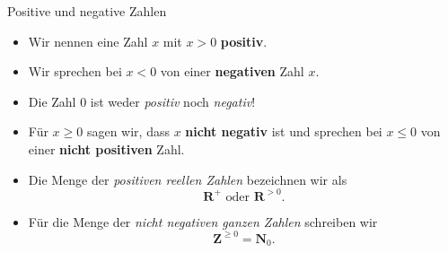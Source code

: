 \documentclass[12pt,ngerman,a4paper,ignorenonframetext,]{beamer}
\providecommand{\tightlist}{%
  \setlength{\itemsep}{0pt}\setlength{\parskip}{0pt}}
\begin{document}
\begin{frame}{Positive und negative Zahlen}
\protect\hypertarget{positive-und-negative-zahlen}{}


\begin{definition}

\begin{itemize}
\tightlist
\item
  Wir nennen eine Zahl \(x\) mit \(x > 0\) \textbf{positiv}.
\item
  Wir sprechen bei \(x < 0\) von einer \textbf{negativen} Zahl \(x\).
\item
  Die Zahl \(0\) ist weder \emph{positiv} noch \emph{negativ}!
\item
  Für \(x \geq 0\) sagen wir, dass \(x\) \textbf{nicht negativ} ist und
  sprechen bei \(x \leq 0\) von einer \textbf{nicht positiven} Zahl.
\item
  Die Menge der \emph{positiven reellen Zahlen} bezeichnen wir als
  \begin{equation*}
        \mathbf{R}^+ \text{  oder  }\mathbf{R}^{>0}.
    \end{equation*}
\item
  Für die Menge der \emph{nicht negativen ganzen Zahlen} schreiben wir
  \begin{equation*}
        \mathbf{Z}^{\geq 0} = \mathbf{N}_0. 
    \end{equation*}
\end{itemize}

\end{definition}

\end{frame}
\end{document}
